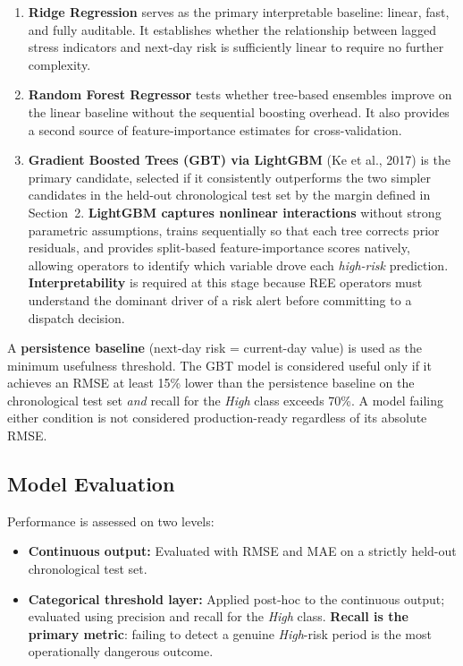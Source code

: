 \documentclass[11pt, a4paper]{article}
\begin{document}
\begin{enumerate}
  \item \textbf{Ridge Regression} serves as the primary interpretable
        baseline: linear, fast, and fully auditable. It establishes
        whether the relationship between lagged stress indicators and
        next-day risk is sufficiently linear to require no further
        complexity.
  \item \textbf{Random Forest Regressor} tests whether tree-based
        ensembles improve on the linear baseline without the sequential
        boosting overhead. It also provides a second source of
        feature-importance estimates for cross-validation.
  \item \textbf{Gradient Boosted Trees (GBT) via LightGBM} (Ke et al.,
        2017) is the primary candidate, selected if it consistently
        outperforms the two simpler candidates in the held-out
        chronological test set by the margin defined in Section~2.
        \textbf{LightGBM captures nonlinear interactions} without strong parametric
        assumptions, trains sequentially so that each tree corrects prior
        residuals, and provides split-based feature-importance scores
        natively, allowing operators to identify which variable drove
        each \textit{high-risk} prediction. \textbf{Interpretability} is required
        at this stage because REE operators must understand the dominant
        driver of a risk alert before committing to a dispatch decision.
\end{enumerate}

A \textbf{persistence baseline} (next-day risk = current-day value) is
used as the minimum usefulness threshold. The GBT model is considered
useful only if it achieves an RMSE at least 15\% lower than the
persistence baseline on the chronological test set \textit{and} recall for
the \textit{High} class exceeds 70\%. A model failing either condition is not
considered production-ready regardless of its absolute RMSE.

\subsection{Model Evaluation}

Performance is assessed on two levels:

\begin{itemize}
  \item \textbf{Continuous output:} Evaluated with RMSE and MAE on a strictly held-out chronological test set.
  \item \textbf{Categorical threshold layer:} Applied post-hoc to the continuous output; evaluated using precision and recall for the \textit{High} class. \textbf{Recall is the primary metric}: failing to detect a genuine \textit{High}-risk period is the most operationally dangerous outcome.
\end{itemize}
\end{document}
